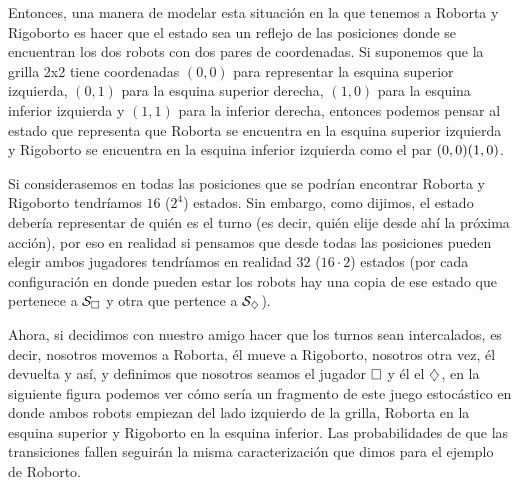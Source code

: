 Entonces, una manera de modelar esta situación en la que tenemos a Roborta y
Rigoborto es hacer que el estado sea un reflejo de las posiciones donde se
encuentran los dos robots con dos pares de coordenadas. Si suponemos que la
grilla 2x2 tiene coordenadas $(0,0)$ para representar la esquina superior
izquierda, $(0,1)$ para la esquina superior derecha, $(1,0)$ para la esquina
inferior izquierda y $(1,1)$ para la inferior derecha, entonces podemos pensar
al estado que representa que Roborta se encuentra en la esquina superior
izquierda y Rigoborto se encuentra en la esquina inferior izquierda como el par
$(0,0) \\ (1,0)$.

Si considerasemos en todas las posiciones que se podrían encontrar Roborta y
Rigoborto tendríamos $16$ ($2^4$) estados. Sin embargo, como dijimos, el estado
debería representar de quién es el turno (es decir, quién elije desde ahí la
próxima acción), por eso en realidad si pensamos que desde todas las posiciones
pueden elegir ambos jugadores tendríamos en realidad $32$ ($16 \cdot 2$)
estados (por cada configuración en donde pueden estar los robots hay una copia
de ese estado que pertenece a $\mathcal{S}_\square$ y otra que pertence a $\mathcal{S}_\diamondsuit$).

Ahora, si decidimos con nuestro amigo hacer que los turnos sean intercalados,
es decir, nosotros movemos a Roborta, él mueve a Rigoborto, nosotros otra vez,
él devuelta y así, y definimos que nosotros seamos el jugador $\square$ y él el
$\diamondsuit$, en la siguiente figura podemos ver cómo sería un fragmento de este
juego estocástico en donde ambos robots empiezan del lado izquierdo de la
grilla, Roborta en la esquina superior y Rigoborto en la esquina inferior. Las
probabilidades de que las transiciones fallen seguirán la misma caracterización
que dimos para el ejemplo de Roborto.

